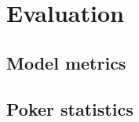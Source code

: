 \newpage

\chapter{Evaluation}
\label{chap:evaluation}

\section{Model metrics}
\label{sec:metrics}

\section{Poker statistics}
\label{sec:statistics}


